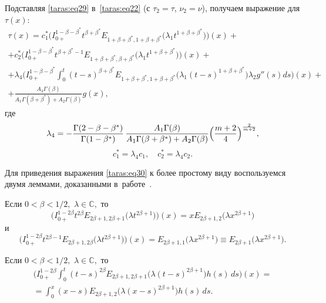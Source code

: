 Подставляя \eqref{taras:eq29} в~\eqref{taras:eq22} (с $ \tau_{2} = \tau$, $\nu_{2}=\nu$), получаем выражение для $ \tau(x)$:
\begin{multline}
\label{taras:eq30}
\tau (x) = c_{1}^{*} 
\bigl( I_{0+}^{1-\beta-\beta^{*}}    t^{  \beta+\beta^{*}} E_{ 1+\beta+\beta^{*}, 1+\beta+\beta^{*}} \bigl( \lambda_{1} t^{ 1+\beta+\beta^{*}} \bigr) \bigr) (x)+ \\
+c_{2}^{*} \bigl( I_{0+}^{1-\beta-\beta^{*}}  t^{  \beta+\beta^{*}-1} E_{ 1+\beta+\beta^{*},\beta+\beta^{*}} \bigl( \lambda_{1} t^{ 1+\beta+\beta^{*}} \bigr) \bigr) (x)  +\\
+ \lambda_{4} 
\biggl( I_{0+}^{1-\beta-\beta^{*}}  \int _{0}^{t} (t-s)^{ \beta+\beta^{*}} E_{ 1+\beta+\beta^{*}, 1+\beta+\beta^{*}} \bigl( \lambda_{1} (t-s)^{ 1+\beta+\beta^{*}} \bigr)  \lambda_{2} g''(s)  ds \biggr) (x)+
\\
+\frac{A_{3} \Gamma(\beta) }{A_{1}\Gamma(\beta+\beta^{*})+A_{2}\Gamma(\beta)} g(x),
\end{multline}
где
\[
\lambda_{4} = - \frac{\Gamma(2-\beta-\beta^{*})}{\Gamma(1-\beta^{*})} \, \frac{A_{1} \Gamma(\beta) }{A_{1}\Gamma(\beta+\beta^{*})+A_{2}\Gamma(\beta)}  \Bigl( \frac{m+2}{4} \Bigr)^{\frac{2}{m+2}},
\]
\[
c_{1}^{*} = \lambda_{4} c_{1}, \quad c_{2}^{*} = \lambda_{4} c_{2}.
\]

Для приведения выражения \eqref{taras:eq30} к более простому виду воспользуемся двумя леммами, доказанными в~работе~\cite{taras:3}.

\begin{lemma}[3]Если $0< \beta < {1}/{2},$ $\lambda \in \mathbb C,$ то
\[
\bigl( I_{0+}^{1-2 \beta}    t^{2 \beta} E_{  2 \beta +1,  2 \beta+1} 
\bigl( \lambda t^{ 2 \beta +1} \bigr) \bigr) (x) = x E_{2 \beta +1,  2} \bigl( \lambda x^{2 \beta +1} \bigr)
\]
и
\[
\bigl( I_{0+}^{1- 2\beta }    t^{ 2 \beta - 1} E_{  2 \beta +1, 2 \beta} \bigl( \lambda t^{ 2 \beta +1} \bigr) \bigr) (x) = 
E_{  2 \beta +1, 1} \bigl( \lambda x^{ 2 \beta +1} \bigr)  \equiv E_{  2 \beta +1} \bigl( \lambda x^{ 2 \beta +1} \bigr).
\]
\end{lemma}

\begin{lemma}[4]Если $0< \beta < {1}/{2},$ $\lambda \in \mathbb C,$ то
\begin{multline}
\biggl( I_{0+}^{1- 2 \beta}  \int _{0}^{t} (t-s)^{2 \beta } E_{ 2 \beta +1, 2 \beta+1} \bigl( \lambda (t-s)^{ 2 \beta +1} \bigr) h(s) \, ds \biggr) (x) =
\\
 = \int _{0}^{x} (x-s) E_{ 2 \beta +1, 2} \bigl( \lambda (x-s)^{ 2 \beta +1} \bigr) h(s) \, ds.
\end{multline}
\end{lemma}

